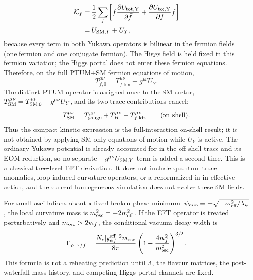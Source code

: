\documentclass[epj]{svjour}
\begin{document}
\begin{align}
\mathcal K_f
&=\frac12\sum_f\left[
\bar f\frac{\partial U_{\rm tot,Y}}{\partial\bar f}
+\frac{\partial U_{\rm tot,Y}}{\partial f}f
\right]\nonumber\\
&=U_{{\rm SM},Y}+U_Y,
\end{align}
because every term in both Yukawa operators is bilinear in the
fermion fields (one fermion and one conjugate fermion). The Higgs
field is held fixed in this fermion variation; the Higgs portal
does not enter these fermion equations. Therefore, on the full
PTUM+SM fermion equations of motion,
\begin{equation}
T_{f,0}^{\mu\nu}
=T_{f,\mathrm{kin}}^{\mu\nu}+g^{\mu\nu}U_Y.
\end{equation}
The distinct PTUM operator is assigned once to the SM sector,
\(T_{\rm SM}^{\mu\nu}=T_{{\rm SM},0}^{\mu\nu}
-g^{\mu\nu}U_Y\), and its two trace contributions cancel:
\begin{equation}
T_{\rm SM}^{\mu\nu}
=T_{\rm gauge}^{\mu\nu}+T_H^{\mu\nu}
+T_{f,\mathrm{kin}}^{\mu\nu}
\qquad\text{(on shell)}.
\end{equation}
Thus the compact kinetic expression is the full-interaction
on-shell result; it is not obtained by applying SM-only equations
of motion while \(U_Y\) is active. The ordinary Yukawa potential
is already accounted for in the off-shell trace and its EOM
reduction, so no separate \(-g^{\mu\nu}U_{{\rm SM},Y}\) term is
added a second time.
This is a classical tree-level EFT derivation. It does not include
quantum trace anomalies, loop-induced curvature operators, or a
renormalized in-in effective action, and the current homogeneous
simulation does not evolve these SM fields.

For small oscillations about a fixed broken-phase minimum,
$\psi_{\min}=\pm\sqrt{-m_{\rm eff}^2/\lambda_\psi}$, the local
curvature mass is $m_{\rm osc}^2=-2m_{\rm eff}^2$. If the EFT
operator is treated perturbatively and $m_{\rm osc}>2m_f$, the
conditional vacuum decay width is
\begin{equation}
\Gamma_{\psi\to f\bar f}=
\frac{N_c|y_{\psi f}^{\rm eff}|^2m_{\rm osc}}{8\pi}
\left(1-\frac{4m_f^2}{m_{\rm osc}^2}\right)^{3/2}.
\end{equation}
This formula is not a reheating prediction until $\Lambda$, the
flavour matrices, the post-waterfall mass history, and competing
Higgs-portal channels are fixed.
\end{document}
